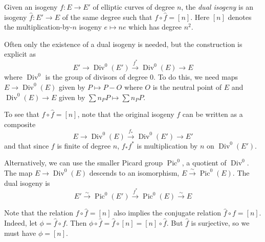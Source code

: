 \documentclass[12pt]{article}
\newcommand{\ra}{\rightarrow}
\newcommand{\<}{\langle}
\renewcommand{\>}{\rangle}
\DeclareMathOperator{\Div}{Div}
\DeclareMathOperator{\Pic}{Pic}
\begin{document}
Given an isogeny $f : E \ra E'$ of elliptic curves of degree $n$, the \emph{dual isogeny} is an isogeny $\hat{f} : E' \ra E$ of the same degree such that $f \circ \hat{f} = [n]$.  Here $[n]$ denotes the multiplication-by-$n$ isogeny $e\mapsto ne$ which has degree $n^2$.

Often only the existence of a dual isogeny is needed, but the construction is explicit as
$$E'\ra \Div^0(E')\stackrel{f^*}{\ra}\Div^0(E)\ra E$$
where $\Div^0$ is the group of divisors of degree 0.
To do this, we need maps $E \ra \Div^0(E)$ given by $P\mapsto P - O$ where $O$ is the neutral point of $E$ and $\Div^0(E) \ra E$ given by $\sum n_P P \mapsto \sum n_P P$.

To see that $f \circ \hat{f} = [n]$, note that the original isogeny $f$ can be written as a composite
$$E \ra \Div^0(E)\stackrel{f_*}{\ra} \Div^0(E')\ra E'$$
and that since $f$ is finite of degree $n$, $f_* f^*$ is multiplication by $n$ on $\Div^0(E')$.

Alternatively, we can use the smaller Picard group $\Pic^0$, a quotient of $\Div^0$.  The map $E\ra \Div^0(E)$ descends to an isomorphism, $E\stackrel{\sim}{\ra}\Pic^0(E)$.  The dual isogeny is
$$E' \stackrel{\sim}{\ra} \Pic^0(E')\stackrel{f^*}{\ra}\Pic^0(E)\stackrel{\sim}{\ra} E$$

Note that the relation $f \circ \hat{f} = [n]$ also implies the conjugate relation $\hat{f} \circ f = [n]$.  Indeed, let $\phi = \hat{f} \circ f$.  Then $\phi \circ \hat{f} = \hat{f} \circ [n] = [n] \circ \hat{f}$.  But $\hat{f}$ is surjective, so we must have $\phi = [n]$.
\end{document}

